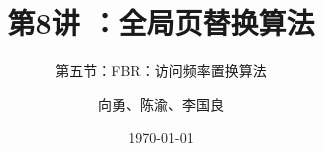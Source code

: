 



\title[第8讲]{第8讲 ：全局页替换算法} %
\subtitle{第五节：FBR：访问频率置换算法}
\author{向勇、陈渝、李国良} %
\date{\today} %




\begin{frame}
\titlepage %
\end{frame}

